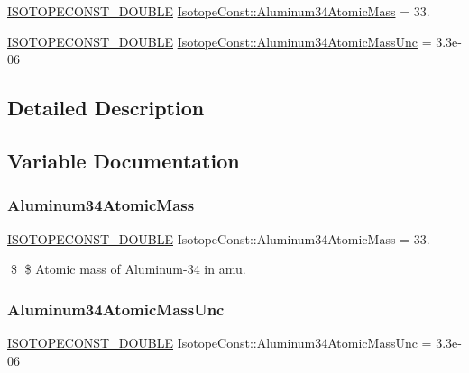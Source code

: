 \begin{DoxyCompactItemize}
\item 
\mbox{\hyperlink{group___isotope_const-_macros_ga8f45a7272ce02c0b4c65c44636ed719a}{I\+S\+O\+T\+O\+P\+E\+C\+O\+N\+S\+T\+\_\+\+D\+O\+U\+B\+LE}} \mbox{\hyperlink{group___isotope_const-_aluminum-_al34_ga29bc088997cc29cd705c55c924be56b6}{Isotope\+Const\+::\+Aluminum34\+Atomic\+Mass}} = 33.
\item 
\mbox{\hyperlink{group___isotope_const-_macros_ga8f45a7272ce02c0b4c65c44636ed719a}{I\+S\+O\+T\+O\+P\+E\+C\+O\+N\+S\+T\+\_\+\+D\+O\+U\+B\+LE}} \mbox{\hyperlink{group___isotope_const-_aluminum-_al34_ga16a5089907b16253b50f04cc3f3ee840}{Isotope\+Const\+::\+Aluminum34\+Atomic\+Mass\+Unc}} = 3.\+3e-\/06
\end{DoxyCompactItemize}


\subsection{Detailed Description}


\subsection{Variable Documentation}
\mbox{\label{group___isotope_const-_aluminum-_al34_ga29bc088997cc29cd705c55c924be56b6}} 
\subsubsection{\texorpdfstring{Aluminum34\+Atomic\+Mass}{Aluminum34AtomicMass}}
{\footnotesize\ttfamily \mbox{\hyperlink{group___isotope_const-_macros_ga8f45a7272ce02c0b4c65c44636ed719a}{I\+S\+O\+T\+O\+P\+E\+C\+O\+N\+S\+T\+\_\+\+D\+O\+U\+B\+LE}} Isotope\+Const\+::\+Aluminum34\+Atomic\+Mass = 33.}

\$ \$ Atomic mass of Aluminum-\/34 in amu. \mbox{\label{group___isotope_const-_aluminum-_al34_ga16a5089907b16253b50f04cc3f3ee840}} 
\subsubsection{\texorpdfstring{Aluminum34\+Atomic\+Mass\+Unc}{Aluminum34AtomicMassUnc}}
{\footnotesize\ttfamily \mbox{\hyperlink{group___isotope_const-_macros_ga8f45a7272ce02c0b4c65c44636ed719a}{I\+S\+O\+T\+O\+P\+E\+C\+O\+N\+S\+T\+\_\+\+D\+O\+U\+B\+LE}} Isotope\+Const\+::\+Aluminum34\+Atomic\+Mass\+Unc = 3.\+3e-\/06}

